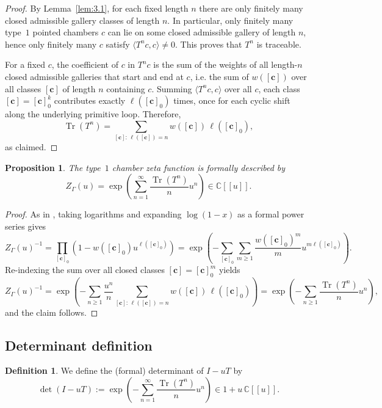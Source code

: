 \documentclass[11pt]{amsart}
\newtheorem{prop}[thm]{Proposition}
\theoremstyle{definition}
\newtheorem{definition}[thm]{Definition}
\theoremstyle{remark}
\numberwithin{equation}{section}
\begin{document}
\begin{proof}
By Lemma~\ref{lem:3.1}, for each fixed length $n$ there are only finitely many closed admissible
gallery classes of length $n$. In particular, only finitely many type~$1$ pointed chambers $c$
can lie on some closed admissible gallery of length $n$, hence only finitely many $c$ satisfy
$\langle T^n c,c\rangle\neq 0$. This proves that $T^n$ is traceable.

For a fixed $c$, the coefficient of $c$ in $T^n c$ is the sum of the weights of all length-$n$
closed admissible galleries that start and end at $c$, i.e. the sum of $w([\mathbf{c}])$ over all
classes $[\mathbf{c}]$ of length $n$ containing $c$. Summing $\langle T^n c,c\rangle$ over all $c$,
each class $[\mathbf{c}]=[\mathbf{c}]_0^k$ contributes exactly $\ell([\mathbf{c}]_0)$ times, once for
each cyclic shift along the underlying primitive loop. Therefore,
\[
\operatorname{Tr}(T^n)
=
\sum_{[\mathbf{c}]:\,\ell([\mathbf{c}])=n} w([\mathbf{c}])\,\ell([\mathbf{c}]_0),
\]
as claimed.
\end{proof}

\begin{prop}\label{prop:4.2}
The type~$1$ chamber zeta function is formally described by
\[
Z_{\Gamma}(u)=
\exp\left(\sum_{n=1}^{\infty}\frac{\operatorname{Tr}(T^n)}{n}u^n\right)
\in \mathbb{C}[\![u]\!].
\]
\end{prop}

\begin{proof}
As in \cite{DK18,HK3}, taking logarithms and expanding $\log(1-x)$ as a formal power series gives
\[
Z_{\Gamma}(u)^{-1}
=
\prod_{[\mathbf{c}]_0}\left(1-w([\mathbf{c}]_0)u^{\ell([\mathbf{c}]_0)}\right)
=
\exp\left(-\sum_{[\mathbf{c}]_0}\sum_{m\ge1}\frac{w([\mathbf{c}]_0)^m}{m}u^{m\ell([\mathbf{c}]_0)}\right).
\]
Re-indexing the sum over all closed classes $[\mathbf{c}]=[\mathbf{c}]_0^m$ yields
\[
Z_{\Gamma}(u)^{-1}
=
\exp\left(-\sum_{n\ge1}\frac{u^n}{n}
\sum_{[\mathbf{c}]:\,\ell([\mathbf{c}])=n} w([\mathbf{c}])\,\ell([\mathbf{c}]_0)\right)
=
\exp\left(-\sum_{n\ge1}\frac{\operatorname{Tr}(T^n)}{n}u^n\right),
\]
and the claim follows.
\end{proof}

\subsection{Determinant definition}

\begin{definition}\label{def:determinant}
We define the (formal) determinant of $I-uT$ by
\[
\det(I-uT)
:=
\exp\left(-\sum_{n=1}^{\infty}\frac{\operatorname{Tr}(T^n)}{n}u^n\right)
\in 1+u\,\mathbb{C}[\![u]\!].
\]
\end{definition}
\end{document}
